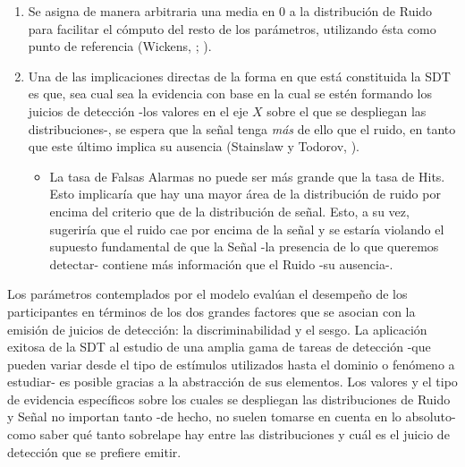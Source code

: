 \begin{enumerate}
\item Se asigna de manera arbitraria una media en 0 a la distribución de Ruido para facilitar el cómputo del resto de los parámetros, utilizando ésta como punto de referencia (Wickens, \citeyear{Wickens1}; \citeyear{Gescheider}).\\

\item Una de las implicaciones directas de la forma en que está constituida la SDT es que, sea cual sea la evidencia con base en la cual se estén formando los juicios de detección -los valores en el eje $X$ sobre el que se despliegan las distribuciones-, se espera que la señal tenga \textit{más} de ello que el ruido, en tanto que este último implica su ausencia (Stainslaw y Todorov, \citeyear{Stainslaw1999}).\\
  \begin{itemize}

  \item La tasa de Falsas Alarmas no puede ser más grande que la tasa de Hits. Esto implicaría que hay una mayor área de la distribución de ruido por encima del criterio que de la distribución de señal. Esto, a su vez, sugeriría que el ruido cae por encima de la señal y se estaría violando el supuesto fundamental de que la Señal -la presencia de lo que queremos detectar- contiene más información que el Ruido -su ausencia-.\\
  \end{itemize}
\end{enumerate}

Los parámetros contemplados por el modelo evalúan el desempeño de los participantes en términos de los dos grandes factores que se asocian con la emisión de juicios de detección: la discriminabilidad y el sesgo. La aplicación exitosa de la SDT al estudio de una amplia gama de tareas de detección -que pueden variar desde el tipo de estímulos utilizados hasta el dominio o fenómeno a estudiar- es posible gracias a la abstracción de sus elementos. Los valores y el tipo de evidencia específicos sobre los cuales se despliegan las distribuciones de Ruido y Señal no importan tanto -de hecho, no suelen tomarse en cuenta en lo absoluto- como saber qué tanto sobrelape hay entre las distribuciones y cuál es el juicio de detección que se prefiere emitir.\\

